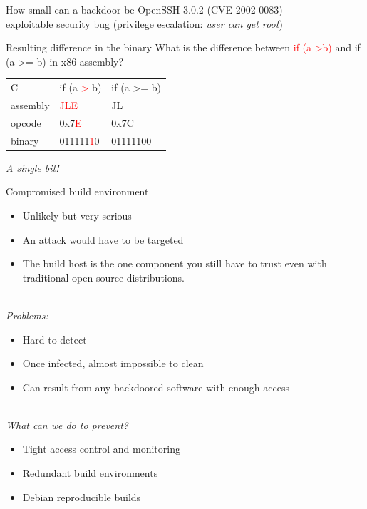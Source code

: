 \documentclass[11pt]{beamer}
\begin{document}
\begin{frame}{How small can a backdoor be}
OpenSSH 3.0.2 (CVE-2002-0083)\\
exploitable security bug (privilege escalation: \emph{user can get root}) 

\end{frame}

\begin{frame}{Resulting difference in the binary}
What is the difference between \textcolor{red}{if (a \textgreater b)} and \textcolor{mygreen}{if (a \textgreater= b)} in x86 assembly? 
\begin{flushleft}
\begin{table}[]
\begin{tabular}{| l | l | l |}
\hline
C        & if (a \textcolor{red}{\textgreater} b) & if (a \textcolor{mygreen}{\textgreater=} b)   \\
assembly & \textcolor{red}{JLE}                   & \textcolor{mygreen}{JL}                       \\
opcode   & 0x7\textcolor{red}{E}                  & 0x7\textcolor{mygreen}{C}                     \\
binary   & 011111\textcolor{red}{1}0              & 011111\textcolor{mygreen}{0}0                 \\
\hline
\end{tabular}
\end{table}
\end{flushleft}
\emph{A single bit!}
\end{frame}

\begin{frame}{Compromised build environment}
\begin{itemize}
\item Unlikely but very serious\\
\item An attack would have to be targeted\\ %
\item The build host is the one component you still have to trust even with traditional open source distributions. %
\end{itemize}
\\[0.2cm]
\pause
\emph{Problems:}
\begin{itemize}
\item Hard to detect
\item Once infected, almost impossible to clean
\item Can result from any backdoored software with enough access
\end{itemize}
\\[0.2cm]
\pause
\emph{What can we do to prevent?}
\begin{itemize}
\item Tight access control and monitoring
\item Redundant build environments  %
\item Debian reproducible builds    %
\end{itemize}
\end{frame}
\end{document}
